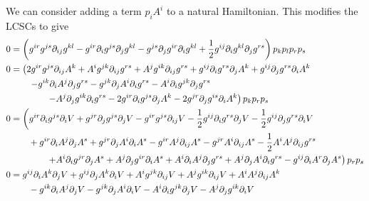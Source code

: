 \documentclass{article}
\begin{document}
\begin{remark}
We can consider adding a term $p_i A^i$ to a natural Hamiltonian. This modifies the LCSCs to give 
\begin{align*}
	0&=\left(g\sp{ir} g\sp{js}\partial_{ij} g\sp{kl} - g\sp{ir}\partial_{i} g\sp{js} \partial_{j}  g\sp{kl}
	- g\sp{js}\partial_{j} g\sp{ir} \partial_{i}  g\sp{kl} +\frac12 g\sp{ij}\partial_{i} g\sp{kl}\partial_{j} g\sp{rs}
	\right)p_k p_l p_r p_s\\
	0&=\left( 2 g\sp{ir} g\sp{js}\partial_{ij} A\sp{k} 
	+  A\sp{i} g\sp{jk} \partial_{ij} g\sp{rs} + A\sp{j} g\sp{ik} \partial_{ij} g\sp{rs} +
	g\sp{ij} \partial_{i}  g\sp{rs}  \partial_{j} A\sp{k} + g\sp{ij} \partial_{j}  g\sp{rs}  \partial_{i} A\sp{k}
	\right.\\
	&\qquad  \left. 
	- g\sp{ik} \partial_i A\sp{j} \partial_j g\sp{rs} - g\sp{jk} \partial_j A\sp{i} \partial_i g\sp{rs}
	- A\sp{i}  \partial_{i}  g\sp{jk } \partial_j g\sp{rs} 
	\right.\\
	&\qquad \qquad  \left.
	- A\sp{j}  \partial_{j}  g\sp{ik } \partial_i g\sp{rs}
	- 2 g\sp{ir}\partial_i g\sp{js}\partial_j A\sp{k}  -2 g\sp{jr}\partial_j g\sp{is}\partial_i A\sp{k} 
	\right)p_k  p_r p_s\\
	0&=\left( g\sp{ir} \partial_i g\sp{js} \partial_i V +g\sp{jr} \partial_j g\sp{js} \partial_j V
	- g\sp{ir} g\sp{js}\partial_{ij} V
	-\frac12 g\sp{ij} \partial_i g\sp{rs} \partial_j V -\frac12 g\sp{ij} \partial_j g\sp{rs} \partial_i V
	\right. \\
	&\qquad 
	+g\sp{ir} \partial_i A\sp{j} \partial_j A\sp{s} +g\sp{jr} \partial_j A\sp{i} \partial_i A\sp{s}
	- g\sp{ir} A\sp{j} \partial_{ij} A\sp{s} - g\sp{jr} A\sp{i} \partial_{ij} A\sp{s}
	-\frac12 A\sp{i}  A\sp{j}   \partial_{ij} g\sp{rs}
	\\
	&\qquad \qquad \left.
	+ A\sp{i} \partial_{i} g\sp{jr} \partial_{j} A\sp{s}+ A\sp{j} \partial_{j} g\sp{ir} \partial_{i} A\sp{s}
	+A\sp{i} \partial_{i} A\sp{j}  \partial_{j}  g\sp{rs} +A\sp{j} \partial_{j} A\sp{i}  \partial_{i}  g\sp{rs}
	- g\sp{ij} \partial_i A\sp{r} \partial_j A\sp{s} \right) p_r p_s
	\\
	0&= g\sp{ij} \partial_i A\sp{k} \partial_j V+g\sp{ij} \partial_j A\sp{k} \partial_i V
	+ A\sp{i} g\sp{jk} \partial_{ij} V + A\sp{j} g\sp{ik} \partial_{ij} V + A\sp{i} A\sp{j} \partial_{ij} A\sp{k}
	\\
	&\qquad  
	- g\sp{ik} \partial_i A\sp{j} \partial_j V  - g\sp{jk} \partial_j A\sp{i} \partial_i V
	-A\sp{i} \partial_i g\sp{jk} \partial_j V  -A\sp{j} \partial_j g\sp{ik} \partial_i V

\end{align*}
\end{remark}
\end{document}
